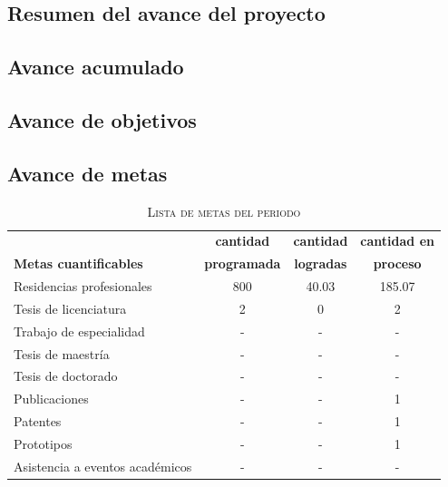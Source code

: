 \documentclass[letterpaper]{elsarticle}
\begin{document}
\subsection{Resumen del avance del proyecto} 


\subsection{Avance acumulado}
\subsection{Avance de objetivos}

\subsection{Avance de metas}
%

\begin{table}[!h]
\renewcommand{\arraystretch}{1.3}
\caption{\textsc{Lista de metas del periodo}}
\label{tb:metas}
\centering
\begin{tabular}{lccc}
\bfseries  & \bfseries cantidad&\bfseries cantidad&\bfseries cantidad en\\
\bfseries Metas cuantificables & \bfseries programada &\bfseries logradas& \bfseries proceso\\
\hline
Residencias profesionales & 800& 40.03 & 185.07\\
Tesis de licenciatura &2& 0 & 2\\
Trabajo de especialidad& -& - & -\\
Tesis de maestría& -& - & -\\
Tesis de doctorado& -& - & -\\
Publicaciones& - & - & 1\\
Patentes& - & - & 1\\
Prototipos& - & - & 1\\
Asistencia a eventos académicos &- &-&-\\
\hline
\end{tabular}
\end{table}
\end{document}
